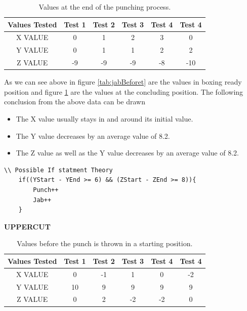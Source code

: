 \documentclass[a4paper,12pt]{report}
\begin{document}
\begin{table}[h]
    \centering
    \begin{tabular}{||c c c c c c||} 
     \hline
     \textbf{Values Tested} & \textbf{Test 1} & \textbf{Test 2} & \textbf{Test 3} & \textbf{Test 4} & \textbf{Test 4} \\ [0.5ex] 
     \hline\hline
     X VALUE & 0 & 1 & 2 & 3 & 0\\ 
     \hline
     Y VALUE & 0 & 1 & 1 & 2 & 2\\  
     \hline
     Z VALUE & -9 & -9 & -9 & -8 & -10\\
     \hline
    \end{tabular}
    \caption{Values at the end of the punching process.}
    \label{tab:jabAfter}
\end{table}

As we can see above in figure \ref{tab:jabBeforet} are the values in boxing ready position and  figure \ref{tab:jabAfter} are the values at the concluding position.
The following conclusion from the above data can be drawn 
\begin{itemize}
    \item The X value usually stays in and around its initial value.
    \item The Y value decreases by an average value of 8.2.
    \item The Z value as well as the Y value decreases by an average value of 8.2.
\end{itemize}
\newpage
\begin{verbatim}
\\ Possible If statment Theory
    if((YStart - YEnd >= 6) && (ZStart - ZEnd >= 8)){
        Punch++
        Jab++
    }
\end{verbatim}


\begin{center}
    \textbf{UPPERCUT}
\end{center}{}
\begin{table}[h]
    \centering
    \begin{tabular}{||c c c c c c||} 
     \hline
     \textbf{Values Tested} & \textbf{Test 1} & \textbf{Test 2} & \textbf{Test 3} & \textbf{Test 4} & \textbf{Test 4} \\ [0.5ex] 
     \hline\hline
     X VALUE & 0 & -1 & 1 & 0 & -2\\ 
     \hline
     Y VALUE & 10 & 9 & 9 & 9 & 9\\  
     \hline
     Z VALUE & 0 & 2 & -2 & -2 & 0\\
     \hline
    \end{tabular}
    \caption{Values before the punch is thrown in a starting position.}
    \label{tab:uppercutBeforet}
\end{table}
\end{document}
